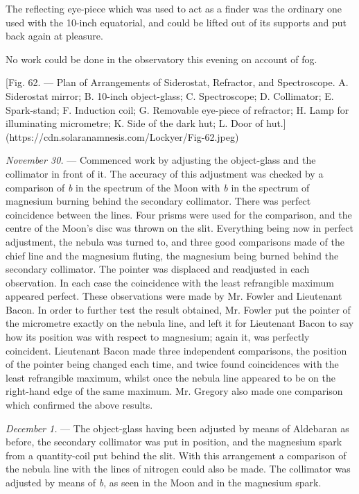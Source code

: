 \documentclass[a4paper, 12pt, oneside, polutonikogreek, english]{article}
\begin{document}
The reflecting eye-piece which was used to act as a finder was the ordinary one used with the 10-inch equatorial, and could be lifted out of its supports and put back again at pleasure.

No work could be done in the observatory this evening on account of fog.

[Fig. 62. --- Plan of Arrangements of Siderostat, Refractor, and Spectroscope. A. Siderostat mirror; B. 10-inch object-glass; C. Spectroscope; D. Collimator; E. Spark-stand; F. Induction coil; G. Removable eye-piece of refractor; H. Lamp for illuminating micrometre; K. Side of the dark hut; L. Door of hut.](https://cdn.solaranamnesis.com/Lockyer/Fig-62.jpeg)

\emph{November 30.} --- Commenced work by adjusting the object-glass and the collimator in front of it. The accuracy of this adjustment was checked by a comparison of \emph{b} in the spectrum of the Moon with \emph{b} in the spectrum of magnesium burning behind the secondary collimator. There was perfect coincidence between the lines. Four prisms were used for the comparison, and the centre of the Moon's disc was thrown on the slit. Everything being now in perfect adjustment, the nebula was turned to, and three good comparisons made of the chief line and the magnesium fluting, the magnesium being burned behind the secondary collimator. The pointer was displaced and readjusted in each observation. In each case the coincidence with the least refrangible maximum appeared perfect. These observations were made by Mr. Fowler and Lieutenant Bacon. In order to further test the result obtained, Mr. Fowler put the pointer of the micrometre exactly on the nebula line, and left it for Lieutenant Bacon to say how its position was with respect to magnesium; again it, was perfectly coincident. Lieutenant Bacon made three independent comparisons, the position of the pointer being changed each time, and twice found coincidences with the least refrangible maximum, whilst once the nebula line appeared to be on the right-hand edge of the same maximum. Mr. Gregory also made one comparison which confirmed the above results.

\emph{December 1.} --- The object-glass having been adjusted by means of Aldebaran as before, the secondary collimator was put in position, and the magnesium spark from a quantity-coil put behind the slit. With this arrangement a comparison of the nebula line with the lines of nitrogen could also be made. The collimator was adjusted by means of \emph{b}, as seen in the Moon and in the magnesium spark.
\end{document}

